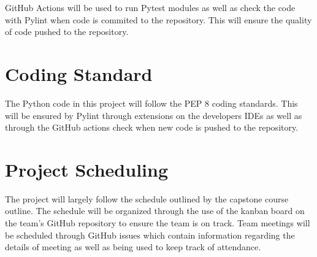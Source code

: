 \documentclass{article}
\begin{document}
GitHub Actions will be used to run Pytest modules as well as check the code with Pylint when code is commited to the repository.
This will ensure the quality of code pushed to the repository.

\section{Coding Standard}

The Python code in this project will follow the PEP 8 coding standards.
This will be ensured by Pylint through extensions on the developers IDEs
as well as through the GitHub actions check when new code is pushed to the repository.

\section{Project Scheduling}

The project will largely follow the schedule outlined by the capstone course outline.
The schedule will be organized through the use of the kanban board on the team's GitHub
repository to ensure the team is on track. Team meetings will be scheduled through GitHub issues
which contain information regarding the details of meeting as well as being used to
keep track of attendance.
\end{document}
